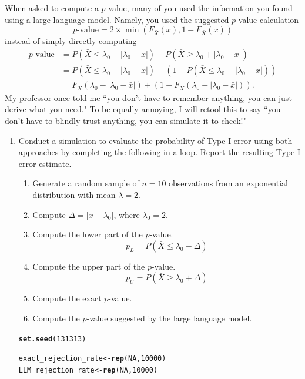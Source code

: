 \documentclass{article}\usepackage[]{graphicx}\usepackage[]{xcolor}
\makeatletter
\newcommand{\hlnum}[1]{\textcolor[rgb]{0.686,0.059,0.569}{#1}}%
\newcommand{\hldef}[1]{\textcolor[rgb]{0.345,0.345,0.345}{#1}}%
\newcommand{\hlkwb}[1]{\textcolor[rgb]{0.69,0.353,0.396}{#1}}%
\newcommand{\hlkwd}[1]{\textcolor[rgb]{0.737,0.353,0.396}{\textbf{#1}}}%
\newenvironment{kframe}{%
 \def\at@end@of@kframe{}%
 \ifinner\ifhmode%
  \def\at@end@of@kframe{\end{minipage}}%
  \begin{minipage}{\columnwidth}%
 \fi\fi%
 \def\FrameCommand##1{\hskip\@totalleftmargin \hskip-\fboxsep
 \colorbox{shadecolor}{##1}\hskip-\fboxsep
     \hskip-\linewidth \hskip-\@totalleftmargin \hskip\columnwidth}%
 \MakeFramed {\advance\hsize-\width
   \@totalleftmargin\z@ \linewidth\hsize
   \@setminipage}}%
 {\par\unskip\endMakeFramed%
 \at@end@of@kframe}
\newenvironment{knitrout}{}{} %
\makeatother
\begin{document}
\begin{enumerate}
When asked to compute a $p$-value, many of you used the information you found
using a large language model. Namely, you used the suggested $p$-value 
calculation
\[p\textrm{-value} = 2 \times \min\left(F_{\bar{X}}(\bar{x}),1-F_{\bar{X}}(\bar{x})\right)\]
instead of simply directly computing
\begin{align*}
p\textrm{-value} &= P(\bar{X} \leq \lambda_0 - \lvert \lambda_0 - \bar{x}\rvert)
+ P(\bar{X} \geq \lambda_0 + \lvert \lambda_0 - \bar{x}\rvert)\\
&= P(\bar{X} \leq \lambda_0 - \lvert \lambda_0 - \bar{x}\rvert)
+ (1 - P(\bar{X} \leq \lambda_0 + \lvert \lambda_0 - \bar{x}\rvert))\\
&= F_{\bar{X}}(\lambda_0 - \lvert \lambda_0 - \bar{x}\rvert)
+ (1-F_{\bar{X}}(\lambda_0 + \lvert \lambda_0 - \bar{x}\rvert)).
\end{align*}
My professor once told me ``you don't have to remember anything, you can just 
derive what you need." To be equally annoying, I will retool this to say ``you 
don't have to blindly trust anything, you can simulate it to check!"
\begin{enumerate}
\item Conduct a simulation to evaluate the probability of Type I error
using both approaches by completing the following in a loop. Report the 
resulting Type I error estimate.
\begin{enumerate}
\item Generate a random sample of $n=10$ observations from an exponential 
distribution with mean $\lambda=2$.
\item Compute $\Delta = \lvert \bar{x}-\lambda_0 \rvert$, where $\lambda_0=2$.
\item Compute the lower part of the $p$-value.
\[p_L = P(\bar{X} \leq \lambda_0 - \Delta)\]
\item Compute the upper part of the $p$-value.
\[p_U = P(\bar{X} \geq \lambda_0 + \Delta)\]
\item Compute the exact $p$-value.
\item Compute the $p$-value suggested by the large language model.
\end{enumerate}
\begin{knitrout}\scriptsize
{}\color{fgcolor}\begin{kframe}
\begin{alltt}
\hlkwd{set.seed}\hldef{(}\hlnum{131313}\hldef{)}

\hldef{exact_rejection_rate} \hlkwb{<-} \hlkwd{rep}\hldef{(}\hlnum{NA}\hldef{,} \hlnum{10000}\hldef{)}
\hldef{LLM_rejection_rate} \hlkwb{<-} \hlkwd{rep}\hldef{(}\hlnum{NA}\hldef{,} \hlnum{10000}\hldef{)}


\end{alltt}
\end{kframe}
\end{knitrout}
\end{enumerate}
\end{enumerate}
\end{document}
